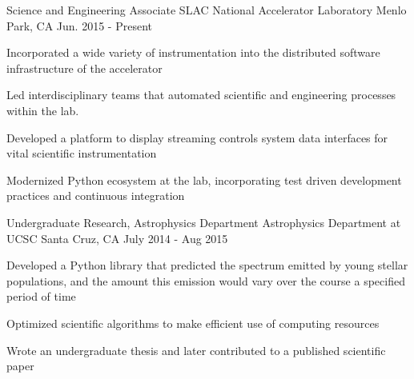 \begin{cventries}
  \cventry
    {Science and Engineering Associate}
    {SLAC National Accelerator Laboratory}
    {Menlo Park, CA}
    {Jun. 2015 - Present}
    {
      \begin{cvitems}
	\item {Incorporated a wide variety of instrumentation into the
	       distributed software infrastructure of the accelerator} 
        \item {Led interdisciplinary teams that automated scientific and engineering processes within the lab.}
        \item {Developed a platform to display streaming controls system data
	       interfaces for vital scientific instrumentation}
	\item {Modernized Python ecosystem at the lab, incorporating test
	       driven development practices and continuous integration}
      \end{cvitems}
    }
  \cventry
    {Undergraduate Research, Astrophysics Department}
    {Astrophysics Department at UCSC}
    {Santa Cruz, CA}
    {July 2014 - Aug 2015}
    {
      \begin{cvitems}
        \item {Developed a Python library that predicted the spectrum emitted by young
               stellar populations, and the amount this emission would vary
               over the course a specified period of time}
        \item {Optimized scientific algorithms to make efficient use of computing resources}
        \item {Wrote an undergraduate thesis and later contributed to a
               published scientific paper}
      \end{cvitems}
      }
\end{cventries}
